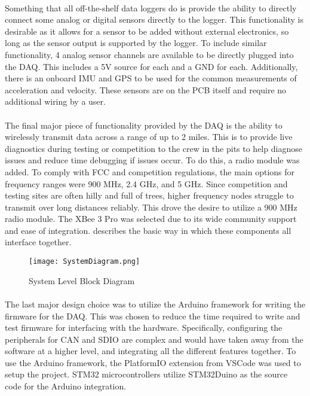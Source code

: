 \paragraph{}
Something that all off-the-shelf data loggers do is provide the ability to directly connect some analog or digital sensors directly to the logger.
This functionality is desirable as it allows for a sensor to be added without external electronics, so long as the sensor output is supported by the logger.
To include similar functionality, 4 analog sensor channels are available to be directly plugged into the DAQ.
This includes a 5V source for each and a GND for each.
Additionally, there is an onboard IMU and GPS to be used for the common measurements of acceleration and velocity.
These sensors are on the PCB itself and require no additional wiring by a user.

\paragraph{}
The final major piece of functionality provided by the DAQ is the ability to wirelessly transmit data across a range of up to 2 miles.
This is to provide live diagnostics during testing or competition to the crew in the pits to help diagnose issues and reduce time debugging if issues occur.
To do this, a radio module was added.
To comply with FCC and competition regulations, the main options for frequency ranges were 900 MHz, 2.4 GHz, and 5 GHz.
Since competition and testing sites are often hilly and full of trees, higher frequency nodes struggle to transmit over long distances reliably.
This drove the desire to utilize a 900 MHz radio module.
The XBee 3 Pro was selected due to its wide community support and ease of integration.
 describes the basic way in which these components all interface together.

\begin{figure}[H]
	\centering
	\texttt{[image: SystemDiagram.png]}
	\caption{System Level Block Diagram}
	\label{fig:SysDiagram}
\end{figure}

\paragraph{}
The last major design choice was to utilize the Arduino framework for writing the firmware for the DAQ.
This was chosen to reduce the time required to write and test firmware for interfacing with the hardware.
Specifically, configuring the peripherals for CAN and SDIO are complex and would have taken away from the software at a higher level, and integrating all the different features together.
To use the Arduino framework, the PlatformIO \cite{PlatformIOSite} extension from VSCode was used to setup the project.
STM32 microcontrollers utilize STM32Duino \cite{STM32DuinoGithub} as the source code for the Arduino integration.